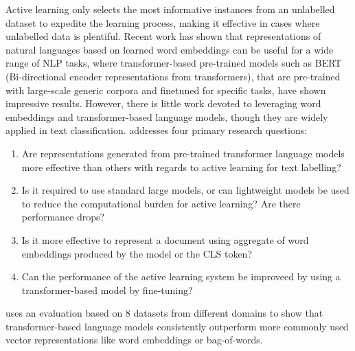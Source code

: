 Active learning only selects the most informative instances from an unlabelled dataset
to expedite the learning process, making it effective in cases where unlabelled data is 
plentiful. Recent work has shown that representations of natural languages based on 
learned word embeddings can be useful for a wide range of NLP tasks, where 
transformer-based pre-trained models such as BERT (Bi-directional encoder representations 
from transformers), that are pre-trained with large-scale generic corpora and finetuned 
for specific tasks, have shown impressive results. However, there is little work devoted to 
leveraging word embeddings and transformer-based language models, though they are widely 
applied in text classification. \cite{lu2020investigating} addresses four primary research 
questions: 
\begin{enumerate}
    \item Are representations generated from pre-trained transformer language models more 
        effective than others with regards to active learning for text labelling?
    \item Is it required to use standard large models, or can lightweight models be used to 
        reduce the computational burden for active learning? Are there performance drops?
    \item Is it more effective to represent a document using aggregate of word embeddings 
        produced by the model or the CLS token? 
    \item Can the performance of the active learning system be improveed by using a 
        transformer-based model by fine-tuning? 
\end{enumerate}

\cite{lu2020investigating} uses an evaluation based on 8 datasets from different domains
to show that transformer-based language models consistently outperform more commonly used 
vector representations like word embeddings or bag-of-words. 